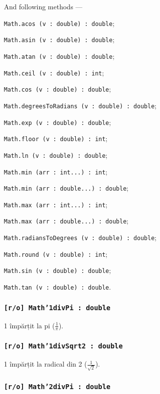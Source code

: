 And following methods —
\begin{icItems}
	\item \texttt{Math.acos (v : double) : double};
	\item \texttt{Math.asin (v : double) : double};
	\item \texttt{Math.atan (v : double) : double};
	\item \texttt{Math.ceil (v : double) : int};
	\item \texttt{Math.cos (v : double) : double};
	\item \texttt{Math.degreesToRadians (v : double) : double};
	\item \texttt{Math.exp (v : double) : double};
	\item \texttt{Math.floor (v : double) : int};
	\item \texttt{Math.ln (v : double) : double};
	\item \texttt{Math.min (arr : int...) : int};
	\item \texttt{Math.min (arr : double...) : double};
	\item \texttt{Math.max (arr : int...) : int};
	\item \texttt{Math.max (arr : double...) : double};
	\item \texttt{Math.radiansToDegrees (v : double) : double};
	\item \texttt{Math.round (v : double) : int};
	\item \texttt{Math.sin (v : double) : double};
	\item \texttt{Math.tan (v : double) : double}.
\end{icItems}

\subsubsection{\texttt{[r/o] Math'1divPi : double}}

1 împărțit la pi ($\frac{1}{\pi}$).

\subsubsection{\texttt{[r/o] Math'1divSqrt2 : double}}

1 împărțit la radical din 2 ($\frac{1}{\sqrt{2}}$).

\subsubsection{\texttt{[r/o] Math'2divPi : double}}

